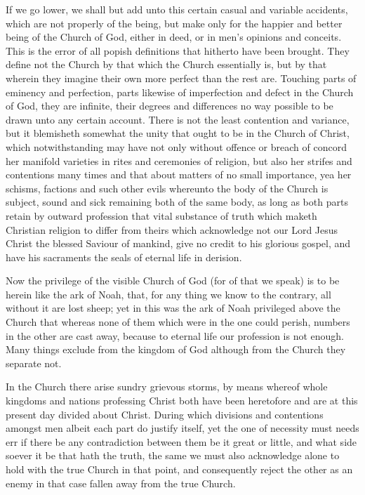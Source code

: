 If we go lower, we shall but add unto this certain casual and variable accidents, which are not properly of the being, but make only for the happier and better being of the Church of God, either in deed, or in men’s opinions and conceits. This is the error of all popish definitions that hitherto have been brought. They define not the Church by that which the Church essentially is, but by that wherein they imagine their own more perfect than the rest are. Touching parts of eminency and perfection, parts likewise of imperfection and defect in the Church of God, they are infinite, their degrees and differences no way possible to be drawn unto any certain account. There is not the least contention and variance, but it blemisheth somewhat the unity that ought to be in the Church of Christ, which notwithstanding may have not only without offence or breach of concord her manifold varieties in rites and ceremonies of religion, but also her strifes and contentions many times and that about matters of no small importance, yea her schisms, factions and such other evils whereunto the body of the Church is subject, sound and sick remaining both of the same body, as long as both parts retain by outward profession that vital substance of truth which maketh Christian religion to differ from theirs which acknowledge not our Lord Jesus Christ the blessed Saviour of mankind, give no credit to his glorious gospel, and have his sacraments the seals of eternal life in derision.

Now the privilege of the visible Church of God (for of that we speak) is to be herein like the ark of Noah, that, for any thing we know to the contrary, all without it are lost sheep; yet in this was the ark of Noah privileged above the Church that whereas none of them which were in the one could perish, numbers in the other are cast away, because to eternal life our profession is not enough. Many things exclude from the kingdom of God although from the Church they separate not.

In the Church there arise sundry grievous storms, by means  whereof whole kingdoms and nations professing Christ both have been heretofore and are at this present day divided about Christ. During which divisions and contentions amongst men albeit each part do justify itself, yet the one of necessity must needs err if there be any contradiction between them be it great or little, and what side soever it be that hath the truth, the same we must also acknowledge alone to hold with the true Church in that point, and consequently reject the other as an enemy in that case fallen away from the true Church.

